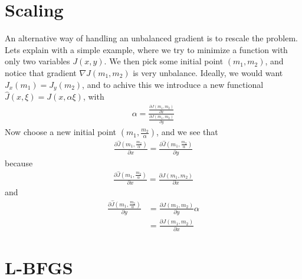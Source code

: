 \documentclass[11pt,a4paper]{article}
\begin{document}
\section{Scaling}
An alternative way of handling an unbalanced gradient is to rescale the problem. Lets explain with a simple example, where we try to minimize a function with only two variables $J(x,y)$. We then pick some initial point $(m_1,m_2)$, and notice that gradient $\nabla J(m_1,m_2)$ is very unbalance. Ideally, we would want $J_x(m_1)=J_y(m_2)$, and to achive this we introduce a new functional $\hat{J}(x,\xi)=J(x,\alpha\xi)$, with 
\begin{align*}
\alpha = \frac{\frac{\partial J(m_1,m_2)}{\partial x}}{\frac{\partial J(m_1,m_2)}{\partial y}}
\end{align*} 
Now choose a new initial point $(m_1,\frac{m_2}{\alpha})$, and we see that 
\begin{align*}
\frac{\partial \hat{J}(m_1,\frac{m_2}{\alpha})}{\partial x}=\frac{\partial\hat{J}(m_1,\frac{m_2}{\alpha})}{\partial y}
\end{align*}
because
\begin{align*}
\frac{\partial \hat{J}(m_1,\frac{m_2}{\alpha})}{\partial x} = \frac{\partial J(m_1,m_2)}{\partial x}
\end{align*}
and
\begin{align*}
\frac{\partial\hat{J}(m_1,\frac{m_2}{\alpha})}{\partial y} & = \frac{\partial J(m_1,m_2)}{\partial y}\alpha \\
&=\frac{\partial J(m_1,m_2)}{\partial x}
\end{align*}
\section{L-BFGS}
\end{document}
